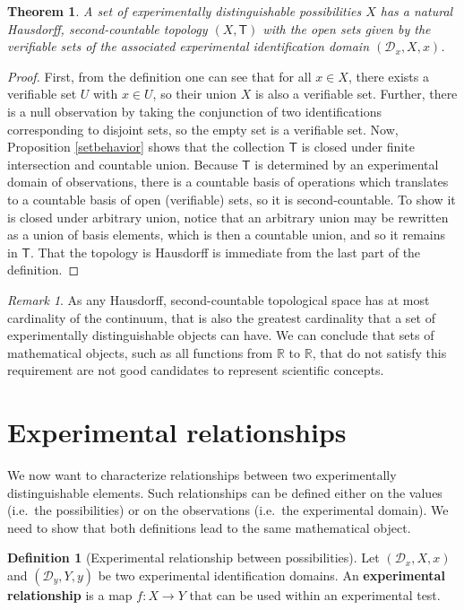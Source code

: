 \documentclass[review]{elsarticle}
\theoremstyle{plain}%
\newtheorem{thm}{Theorem}[section]
\theoremstyle{definition}
\newtheorem{defn}{Definition}[section]
\theoremstyle{remark}
\newtheorem*{rem}{Remark}
\begin{document}
\begin{thm}
A set of experimentally distinguishable possibilities $X$ has a natural Hausdorff, second-countable topology $(X,\mathsf{T})$ with the open sets given by the verifiable sets of the associated experimental identification domain $(\mathcal{D}_x, X, x)$.
\end{thm}
\begin{proof}
First, from the definition one can see that for all $x\in X$, there exists a verifiable set $U$ with $x\in U$, so their union $X$ is also a verifiable set. Further, there is a null observation by taking the conjunction of two identifications corresponding to disjoint sets, so the empty set is a verifiable set. Now, Proposition \ref{setbehavior} shows that the collection $\mathsf{T}$ is closed under finite intersection and countable union. Because $\mathsf{T}$ is determined by an experimental domain of observations, there is a countable basis of operations which translates to a countable basis of open (verifiable) sets, so it is second-countable. To show it is closed under arbitrary union, notice that an arbitrary union may be rewritten as a union of basis elements, which is then a countable union, and so it remains in $\mathsf{T}$. That the topology is Hausdorff is immediate from the last part of the definition. 
\end{proof}

\begin{rem}
As any Hausdorff, second-countable topological space has at most cardinality of the continuum, that is also the greatest cardinality that a set of experimentally distinguishable objects can have. We can conclude that sets of mathematical objects, such as all functions from $\mathbb{R}$ to $\mathbb{R}$, that do not satisfy this requirement are not good candidates to represent scientific concepts.
\end{rem}

\section{Experimental relationships}

We now want to characterize relationships between two experimentally distinguishable elements. Such relationships can be defined either on the values (i.e.~the possibilities) or on the observations (i.e.~the experimental domain). We need to show that both definitions lead to the same mathematical object.

\begin{defn}[Experimental relationship between possibilities]
	Let $(\mathcal{D}_x, X, x)$ and $(\mathcal{D}_y, Y, y)$ be two experimental identification domains. An \textbf{experimental relationship} is a map $f : X \rightarrow Y$ that can be used within an experimental test.
\end{defn}
\end{document}
